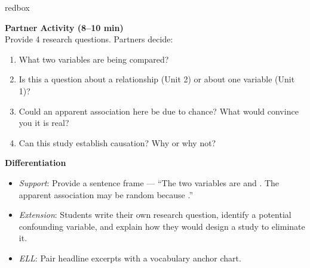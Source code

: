 \documentclass[10pt]{article}
\begin{document}
\begin{skillbox}{redbox}
\begin{minipage}[t]{0.48\linewidth}
    \textbf{Partner Activity (8--10 min)}\\
    Provide 4 research questions. Partners decide:
    \begin{enumerate}
        \item What two variables are being compared?
        \item Is this a question about a relationship (Unit 2) or about one variable (Unit 1)?
        \item Could an apparent association here be due to chance? What would convince you it is real?
        \item Can this study establish causation? Why or why not?
    \end{enumerate}
\end{minipage}
\hfill
\begin{minipage}[t]{0.48\linewidth}
    \textbf{Differentiation}
    \begin{itemize}
        \item \textit{Support}: Provide a sentence frame --- ``The two variables are \underline{\hspace{1cm}} and \underline{\hspace{1cm}}. The apparent association may be random because \underline{\hspace{1cm}}.''
        \item \textit{Extension}: Students write their own research question, identify a potential confounding variable, and explain how they would design a study to eliminate it.
        \item \textit{ELL}: Pair headline excerpts with a vocabulary anchor chart.
    \end{itemize}
\end{minipage}
\end{skillbox}
\end{document}
